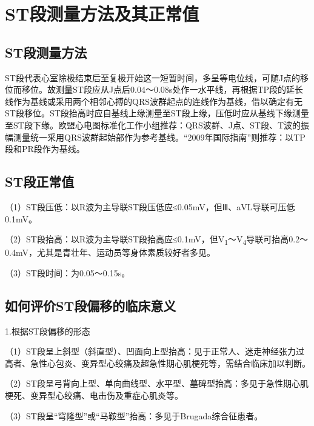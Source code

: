 \protect\hypertarget{text00011.htmlux5cux23subid73}{}{}

\section{ST段测量方法及其正常值}

\protect\hypertarget{text00011.htmlux5cux23subid74}{}{}

\subsection{ST段测量方法}

ST段代表心室除极结束后至复极开始这一短暂时间，多呈等电位线，可随J点的移位而移位。故测量ST段应从J点后0.04～0.08s处作一水平线，再根据TP段的延长线作为基线或采用两个相邻心搏的QRS波群起点的连线作为基线，借以确定有无ST段移位。ST段抬高时应自基线上缘测量至ST段上缘，压低时应从基线下缘测量至ST段下缘。欧盟心电图标准化工作小组推荐：QRS波群、J点、ST段、T波的振幅测量统一采用QRS波群起始部作为参考基线。“2009年国际指南”则推荐：以TP段和PR段作为基线。

\protect\hypertarget{text00011.htmlux5cux23subid75}{}{}

\subsection{ST段正常值}

（1）ST段压低：以R波为主导联ST段压低应≤0.05mV，但Ⅲ、aVL导联可压低0.1mV。

（2）ST段抬高：以R波为主导联ST段抬高应≤0.1mV，但V\textsubscript{1}～V\textsubscript{4}导联可抬高0.2～0.4mV，尤其是青壮年、运动员等身体素质较好者多见。

（3）ST段时间：为0.05～0.15s。

\protect\hypertarget{text00011.htmlux5cux23subid76}{}{}

\subsection{如何评价ST段偏移的临床意义}

1.根据ST段偏移的形态

（1）ST段呈上斜型（斜直型）、凹面向上型抬高：见于正常人、迷走神经张力过高者、急性心包炎、变异型心绞痛及超急性期心肌梗死等，需结合临床加以判断。

（2）ST段呈弓背向上型、单向曲线型、水平型、墓碑型抬高：多见于急性期心肌梗死、变异型心绞痛、电击伤及重症心肌炎等。

（3）ST段呈“穹隆型”或“马鞍型”抬高：多见于Brugada综合征患者。

